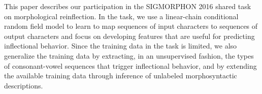 This paper describes our participation in the SIGMORPHON 2016 shared task on morphological reinflection. In the task, we use a linear-chain conditional random field model to learn to map sequences of input characters to sequences of output characters and focus on developing features that are useful for predicting inflectional behavior. Since the training data in the task is limited, we also generalize the training data by extracting, in an unsupervised fashion, the types of consonant-vowel sequences that trigger inflectional behavior, and by extending the available training data through inference of unlabeled morphosyntactic descriptions.
